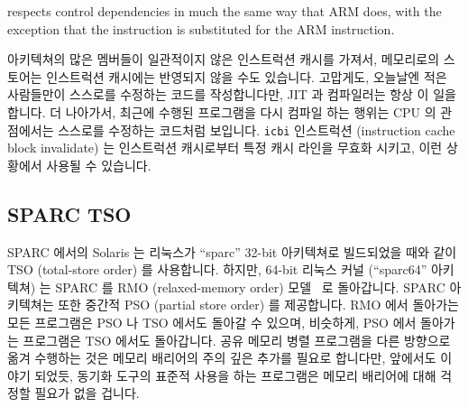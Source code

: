 \Power{} respects control dependencies in much the same way that ARM
does, with the exception that the \Power{}  instruction
is substituted for the ARM  instruction.
\fi

\Power{} 아키텍쳐의 많은 멤버들이 일관적이지 않은 인스트럭션 캐시를 가져서,
메모리로의 스토어는 인스트럭션 캐시에는 반영되지 않을 수도 있습니다.
고맙게도, 오늘날엔 적은 사람들만이 스스로를 수정하는 코드를 작성합니다만, JIT
과 컴파일러는 항상 이 일을 합니다.
더 나아가서, 최근에 수행된 프로그램을 다시 컴파일 하는 행위는 CPU 의 관점에서는
스스로를 수정하는 코드처럼 보입니다.
{\tt icbi} 인스트럭션 (instruction cache block invalidate) 는 인스트럭션
캐시로부터 특정 캐시 라인을 무효화 시키고, 이런 상황에서 사용될 수 있습니다.

\subsection{SPARC TSO}

SPARC 에서의 Solaris 는 리눅스가 ``sparc'' 32-bit 아키텍쳐로 빌드되었을 때와
같이 TSO (total-store order) 를 사용합니다.
하지만, 64-bit 리눅스 커널 (``sparc64'' 아키텍쳐) 는 SPARC 를 RMO
(relaxed-memory order) 모델~\cite{SPARC94} 로 돌아갑니다.
SPARC 아키텍쳐는 또한 중간적 PSO (partial store order) 를 제공합니다.
RMO 에서 돌아가는 모든 프로그램은 PSO 나 TSO 에서도 돌아갈 수 있으며, 비슷하게,
PSO 에서 돌아가는 프로그램은 TSO 에서도 돌아갑니다.
공유 메모리 병렬 프로그램을 다른 방향으로 옮겨 수행하는 것은 메모리 배리어의
주의 깊은 추가를 필요로 합니다만, 앞에서도 이야기 되었듯, 동기화 도구의 표준적
사용을 하는 프로그램은 메모리 배리어에 대해 걱정할 필요가 없을 겁니다.

